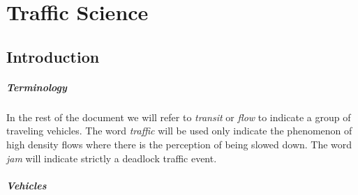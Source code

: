 \chapter{Traffic Science}

\section{Introduction}

\paragraph{Terminology}

In the rest of the document we will refer to \textit{transit} or \textit{flow} to indicate a group of traveling vehicles.
The word \textit{traffic} will be used only indicate the phenomenon of high density flows where there is the perception of being slowed down.
The word \textit{jam} will indicate strictly a deadlock traffic event.

\paragraph{Vehicles}

